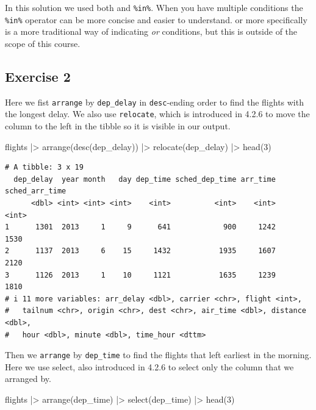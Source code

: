 \documentclass[
  letterpaper,
  DIV=11,
  numbers=noendperiod]{scrreprt}
\newenvironment{Shaded}{\begin{snugshade}}{\end{snugshade}}
\newcommand{\DecValTok}[1]{\textcolor[rgb]{0.68,0.00,0.00}{#1}}
\newcommand{\FunctionTok}[1]{\textcolor[rgb]{0.28,0.35,0.67}{#1}}
\newcommand{\NormalTok}[1]{\textcolor[rgb]{0.00,0.23,0.31}{#1}}
\newcommand{\SpecialCharTok}[1]{\textcolor[rgb]{0.37,0.37,0.37}{#1}}
\begin{document}
In this solution we used both \texttt{\textbar{}} and \texttt{\%in\%}.
When you have multiple conditions the \texttt{\%in\%} operator can be
more concise and easier to understand. \texttt{\textbar{}} or more
specifically \texttt{\textbar{}\textbar{}} is a more traditional way of
indicating \emph{or} conditions, but this is outside of the scope of
this course.

\subsection{Exercise 2}\label{exercise-2-7}

Here we fist \texttt{arrange} by \texttt{dep\_delay} in
\texttt{desc}-ending order to find the flights with the longest delay.
We also use \texttt{relocate}, which is introduced in 4.2.6 to move the
column to the left in the tibble so it is visible in our output.

\begin{Shaded}
\begin{Highlighting}[]
\NormalTok{flights }\SpecialCharTok{|\textgreater{}}
  \FunctionTok{arrange}\NormalTok{(}\FunctionTok{desc}\NormalTok{(dep\_delay)) }\SpecialCharTok{|\textgreater{}}
  \FunctionTok{relocate}\NormalTok{(dep\_delay) }\SpecialCharTok{|\textgreater{}}
  \FunctionTok{head}\NormalTok{(}\DecValTok{3}\NormalTok{)}
\end{Highlighting}
\end{Shaded}

\begin{verbatim}
# A tibble: 3 x 19
  dep_delay  year month   day dep_time sched_dep_time arr_time sched_arr_time
      <dbl> <int> <int> <int>    <int>          <int>    <int>          <int>
1      1301  2013     1     9      641            900     1242           1530
2      1137  2013     6    15     1432           1935     1607           2120
3      1126  2013     1    10     1121           1635     1239           1810
# i 11 more variables: arr_delay <dbl>, carrier <chr>, flight <int>,
#   tailnum <chr>, origin <chr>, dest <chr>, air_time <dbl>, distance <dbl>,
#   hour <dbl>, minute <dbl>, time_hour <dttm>
\end{verbatim}

Then we \texttt{arrange} by \texttt{dep\_time} to find the flights that
left earliest in the morning. Here we use select, also introduced in
4.2.6 to select only the column that we arranged by.

\begin{Shaded}
\begin{Highlighting}[]
\NormalTok{flights }\SpecialCharTok{|\textgreater{}}
  \FunctionTok{arrange}\NormalTok{(dep\_time) }\SpecialCharTok{|\textgreater{}}
  \FunctionTok{select}\NormalTok{(dep\_time) }\SpecialCharTok{|\textgreater{}}
  \FunctionTok{head}\NormalTok{(}\DecValTok{3}\NormalTok{)}
\end{Highlighting}
\end{Shaded}
\end{document}
